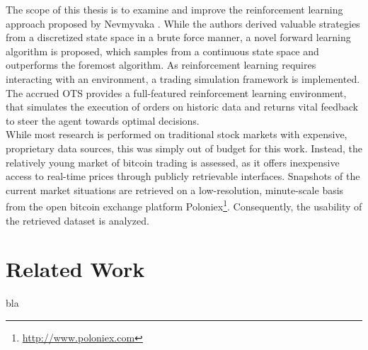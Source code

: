 The scope of this thesis is to examine and improve the reinforcement learning approach proposed by Nevmyvaka \etal\cite{Nevmyvaka:2006}. While the authors derived valuable strategies from a discretized state space in a brute force manner, a novel forward learning algorithm is proposed, which samples from a continuous state space and outperforms the foremost algorithm. As reinforcement learning requires interacting with an environment, a trading simulation framework is implemented. The accrued \acf{OTS} provides a full-featured reinforcement learning environment, that simulates the execution of orders on historic data and returns vital feedback to steer the agent towards optimal decisions.\\

While most research is performed on traditional stock markets with expensive, proprietary data sources, this was simply out of budget for this work. Instead, the relatively young market of bitcoin trading is assessed, as it offers inexpensive access to real-time prices through publicly retrievable interfaces. Snapshots of the current market situations are retrieved on a low-resolution, minute-scale basis from the open bitcoin exchange platform Poloniex\footnote{\url{http://www.poloniex.com}}. Consequently, the usability of the retrieved dataset is analyzed.



\section{Related Work}
\label{sec:relatedwork}
bla



